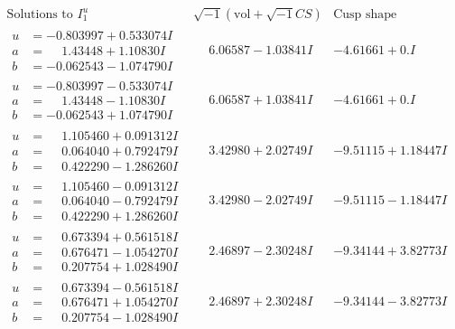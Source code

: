 \documentclass[1p]{elsarticle_modified}
\theoremstyle{definition}
\newcommand{\I}{\sqrt{-1}}
\begin{document}
$$\begin{array}{c|c|c}  
\text{Solutions to }I^u_{1}& \I (\text{vol} + \sqrt{-1}CS) & \text{Cusp shape}\\
 \hline 
\begin{aligned}
u &= -0.803997 + 0.533074 I \\
a &= \phantom{-}1.43448 + 1.10830 I \\
b &= -0.062543 - 1.074790 I\end{aligned}
 & \phantom{-}6.06587 - 1.03841 I & -4.61661 + 0. I\phantom{ +0.000000I} \\ \hline\begin{aligned}
u &= -0.803997 - 0.533074 I \\
a &= \phantom{-}1.43448 - 1.10830 I \\
b &= -0.062543 + 1.074790 I\end{aligned}
 & \phantom{-}6.06587 + 1.03841 I & -4.61661 + 0. I\phantom{ +0.000000I} \\ \hline\begin{aligned}
u &= \phantom{-}1.105460 + 0.091312 I \\
a &= \phantom{-}0.064040 + 0.792479 I \\
b &= \phantom{-}0.422290 - 1.286260 I\end{aligned}
 & \phantom{-}3.42980 + 2.02749 I & -9.51115 + 1.18447 I \\ \hline\begin{aligned}
u &= \phantom{-}1.105460 - 0.091312 I \\
a &= \phantom{-}0.064040 - 0.792479 I \\
b &= \phantom{-}0.422290 + 1.286260 I\end{aligned}
 & \phantom{-}3.42980 - 2.02749 I & -9.51115 - 1.18447 I \\ \hline\begin{aligned}
u &= \phantom{-}0.673394 + 0.561518 I \\
a &= \phantom{-}0.676471 - 1.054270 I \\
b &= \phantom{-}0.207754 + 1.028490 I\end{aligned}
 & \phantom{-}2.46897 - 2.30248 I & -9.34144 + 3.82773 I \\ \hline\begin{aligned}
u &= \phantom{-}0.673394 - 0.561518 I \\
a &= \phantom{-}0.676471 + 1.054270 I \\
b &= \phantom{-}0.207754 - 1.028490 I\end{aligned}
 & \phantom{-}2.46897 + 2.30248 I & -9.34144 - 3.82773 I \\ \hline\begin{aligned}

\end{aligned}
\end{array}$$
\end{document}
